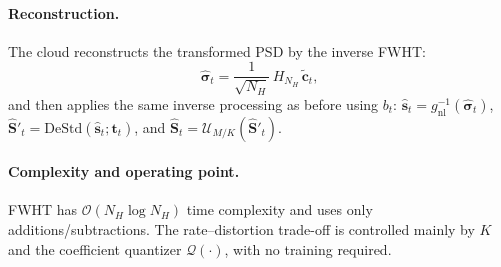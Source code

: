 \documentclass[11pt]{article}
\begin{document}
\paragraph{Reconstruction.}
The cloud reconstructs the transformed PSD by the inverse FWHT:
\begin{equation}
\hat{\bm{\sigma}}_t = \frac{1}{\sqrt{N_H}}\,H_{N_H}\,\tilde{\mathbf{c}}_t,
\end{equation}
and then applies the same inverse processing as before using $b_t$:
$\hat{\mathbf{s}}_t=g_{\mathrm{nl}}^{-1}(\hat{\bm{\sigma}}_t)$,
$\hat{\mathbf{S}}'_t=\mathrm{DeStd}(\hat{\mathbf{s}}_t;\mathbf{t}_t)$,
and $\hat{\mathbf{S}}_t=\mathcal{U}_{M/K}(\hat{\mathbf{S}}'_t)$.

\paragraph{Complexity and operating point.}
FWHT has $\mathcal{O}(N_H\log N_H)$ time complexity and uses only additions/subtractions.
The rate--distortion trade-off is controlled mainly by $K$ and the coefficient quantizer $\mathcal{Q}(\cdot)$,
with no training required.
\end{document}
